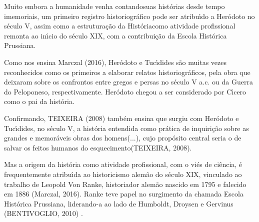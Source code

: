 \documentclass[
12pt,		%
openright,	%
twoside,  %
a4paper,			%
chapter=TITLE,		%
english,			%
french,				%
spanish,			%
brazil				%
]{USPSC-classe/USPSC}
\begin{document}
Muito embora a humanidade venha \textquotedbl contando\textquotedbl  suas hist\'orias desde tempo imemoriais, um primeiro registro historiogr\'afico pode ser atribu\'{\i}do a Her\'odoto no s\'eculo V, assim como a estrutura\c{c}\~ao da \textquotedbl Hist\'oria\textquotedbl  como atividade profissional remonta ao in\'{\i}cio do s\'eculo XIX, com a contribui\c{c}\~ao da Escola Hist\'orica Prussiana.










Como nos ensina  Marczal (2016),  Her\'odoto e Tuc\'{\i}dides s\~ao muitas vezes reconhecidos como os primeiros a elaborar relatos historiogr\'aficos, pela obra que deixaram sobre os confrontos entre gregos e persas no s\'eculo V a.c. ou da Guerra do Peloponeso, respectivamente. Her\'odoto chegou a ser considerado por C\'{\i}cero como o \textquotedbl pai da hist\'oria\textquotedbl .










Confirmando, TEIXEIRA (2008)  tamb\'em ensina que surgiu com Her\'odoto e Tuc\'{\i}dides, no s\'eculo V, a hist\'oria \textquotedbl entendida como pr\'atica de inquiri\c{c}\~ao sobre as grandes e memor\'aveis obras dos homens(...), cujo prop\'osito central seria o de salvar os feitos humanos do esquecimento\textquotedbl   (TEIXEIRA, 2008).










Mas a origem da hist\'oria como atividade profissional, com o vi\'es de ci\^encia, \'e frequentemente atribu\'{\i}da ao historicismo alem\~ao do s\'eculo XIX, vinculado ao trabalho de Leopold Von Ranke, historiador alem\~ao nascido em 1795 e falecido em 1886 (Marczal, 2016). Ranke teve papel no surgimento da chamada Escola Hist\'orica Prussiana, liderando-a ao lado de Humboldt, Droysen e Gervinus  (BENTIVOGLIO, 2010) .
\end{document}
